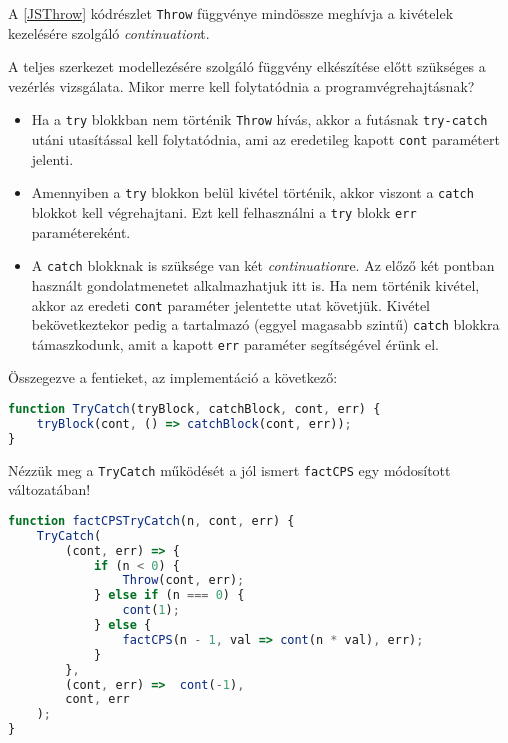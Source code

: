 A \ref{JSThrow} kódrészlet \texttt{Throw} függvénye mindössze meghívja a kivételek kezelésére szolgáló \textit{continuation}t.

A teljes szerkezet modellezésére szolgáló függvény elkészítése előtt szükséges a vezérlés vizsgálata. Mikor merre kell folytatódnia a programvégrehajtásnak?

\begin{itemize}
    \item Ha a \texttt{try} blokkban nem történik \texttt{Throw} hívás, akkor a futásnak \texttt{try-catch} utáni utasítással kell folytatódnia, ami az eredetileg kapott \texttt{cont} paramétert jelenti.
    \item Amennyiben a \texttt{try} blokkon belül kivétel történik, akkor viszont a \texttt{catch} blokkot kell végrehajtani. Ezt kell felhasználni a \texttt{try} blokk \texttt{err} paramétereként.
    \item A \texttt{catch} blokknak is szüksége van két \textit{continuation}re. Az előző két pontban használt gondolatmenetet alkalmazhatjuk itt is. Ha nem történik kivétel, akkor az eredeti \texttt{cont} paraméter jelentette utat követjük. Kivétel bekövetkeztekor pedig a tartalmazó (eggyel magasabb szintű) \texttt{catch} blokkra támaszkodunk, amit a kapott \texttt{err} paraméter segítségével érünk el.
\end{itemize}

Összegezve a fentieket, az implementáció a következő:

\begin{lstlisting}[language=JavaScript, caption={A \textit{try-catch} blokk \textit{CPS}-ben}, captionpos=b, label=JSTryCatch]
function TryCatch(tryBlock, catchBlock, cont, err) {
    tryBlock(cont, () => catchBlock(cont, err));
}
\end{lstlisting}

Nézzük meg a \texttt{TryCatch} működését a jól ismert \texttt{factCPS} egy módosított változatában!

\begin{lstlisting}[language=JavaScript, caption={Faktoriálist kiszámító függvény \textit{CPS}-ben, \texttt{try-catch} szerkezettel}, captionpos=b, label=JSCPSFactTryCatch]
function factCPSTryCatch(n, cont, err) {
    TryCatch(
        (cont, err) => {
            if (n < 0) {
                Throw(cont, err); 
            } else if (n === 0) {
                cont(1);
            } else {
                factCPS(n - 1, val => cont(n * val), err);
            }    
        }, 
        (cont, err) =>  cont(-1),
        cont, err
    );
}
\end{lstlisting}


